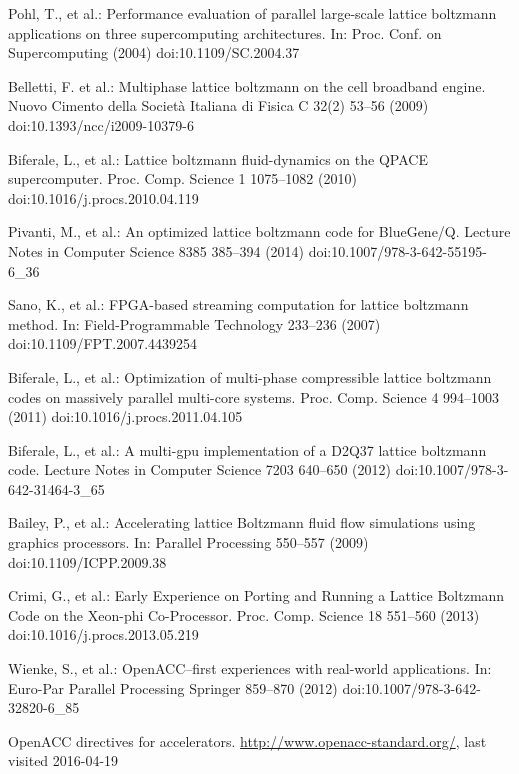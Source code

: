 \documentclass[times]{cpeauth}
\begin{document}
\begin{thebibliography}{10}

Pohl, T., et al.:
Performance evaluation of parallel large-scale lattice boltzmann applications on three supercomputing architectures.
In: Proc. Conf. on Supercomputing (2004) 
doi:10.1109/SC.2004.37

Belletti, F. et al.:
Multiphase lattice boltzmann on the cell broadband engine.
Nuovo Cimento della Societ\`a Italiana di Fisica C 32(2) 53--56 (2009) 
doi:10.1393/ncc/i2009-10379-6

Biferale, L., et al.:
Lattice boltzmann fluid-dynamics on the QPACE supercomputer.
Proc. Comp. Science 1 1075--1082 (2010) 
doi:10.1016/j.procs.2010.04.119

Pivanti, M., et al.:
An optimized lattice boltzmann code for BlueGene/Q.
Lecture Notes in Computer Science 8385  385--394 (2014) 
doi:10.1007/978-3-642-55195-6\_36

Sano, K., et al.:
FPGA-based streaming computation for lattice boltzmann method.
In: Field-Programmable Technology 233--236 (2007) 
doi:10.1109/FPT.2007.4439254

Biferale, L., et al.:
Optimization of multi-phase compressible lattice boltzmann codes on massively parallel multi-core systems.
Proc. Comp. Science 4 994--1003 (2011) 
doi:10.1016/j.procs.2011.04.105

Biferale, L., et al.:
A multi-gpu implementation of a D2Q37 lattice boltzmann code.
Lecture Notes in Computer Science 7203 640--650 (2012) 
doi:10.1007/978-3-642-31464-3\_65

Bailey, P., et al.:
Accelerating lattice Boltzmann fluid flow simulations using graphics processors.
In: Parallel Processing 550--557 (2009) 
doi:10.1109/ICPP.2009.38

Crimi, G., et al.:
Early Experience on Porting and Running a Lattice Boltzmann Code on the Xeon-phi Co-Processor.
Proc. Comp. Science 18 551--560 (2013) 
doi:10.1016/j.procs.2013.05.219

Wienke, S., et al.:
OpenACC--first experiences with real-world applications.
In: Euro-Par Parallel Processing Springer 859--870 (2012) 
doi:10.1007/978-3-642-32820-6\_85

OpenACC directives for accelerators.
\url{http://www.openacc-standard.org/}, last visited 2016-04-19


\end{thebibliography}
\end{document}
